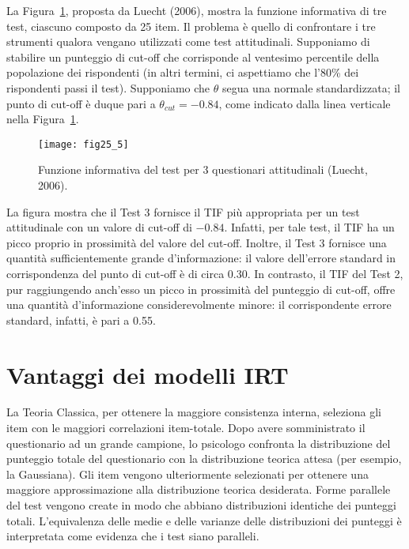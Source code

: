 \begin{exmp}
La Figura~\ref{fig:luecht}, proposta da Luecht (2006), mostra la funzione informativa di tre test, ciascuno  composto da 25 item. Il problema è quello di confrontare i tre strumenti qualora vengano utilizzati come test attitudinali. Supponiamo di stabilire un punteggio di cut-off che corrisponde al ventesimo percentile della popolazione dei rispondenti (in altri termini, ci aspettiamo che l'80\% dei rispondenti passi il test). Supponiamo che $\theta$ segua una normale standardizzata; il punto di cut-off è duque pari a $\theta_{cut} = -0.84$, come indicato dalla linea verticale nella Figura~\ref{fig:luecht}. 

\begin{figure}
  \begin{center}
    \texttt{[image: fig25\_5]}
    \caption{Funzione informativa del test per 3 questionari attitudinali (Luecht, 2006).}
    \label{fig:luecht}
  \end{center}
\end{figure}

La figura mostra che il Test 3 fornisce il TIF più appropriata per un test attitudinale con un valore di cut-off di $-0.84$. Infatti, per tale test, il TIF ha un picco proprio in prossimità del valore del cut-off.  Inoltre, il Test 3 fornisce una quantità sufficientemente grande d'informazione: il valore dell'errore standard in corrispondenza del punto di cut-off è di circa 0.30. In contrasto, il TIF del Test 2, pur raggiungendo anch'esso un picco in prossimità del punteggio di cut-off, offre una quantità d'informazione considerevolmente minore: il corrispondente errore standard, infatti, è pari a 0.55. 
\end{exmp}

\section{Vantaggi dei modelli IRT}

La Teoria Classica, per ottenere la maggiore consistenza interna, seleziona gli item con le maggiori correlazioni item-totale. Dopo avere somministrato il questionario ad un grande campione, lo psicologo confronta la distribuzione del punteggio totale del questionario con la distribuzione teorica attesa (per esempio, la Gaussiana). Gli item vengono ulteriormente selezionati per ottenere una maggiore approssimazione alla distribuzione teorica desiderata. Forme parallele del test vengono create in modo che abbiano distribuzioni identiche dei punteggi totali. L'equivalenza delle medie e delle varianze delle distribuzioni dei punteggi è interpretata come evidenza che i test siano paralleli.

